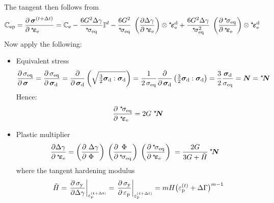 \documentclass[times,namecite]{goose-article}
\newcommand\leftstar[1]{\hspace*{-.3em}~^\star\!#1}
\begin{document}
The tangent then follows from
\begin{equation}
\mathbb{C}_\mathrm{ep}
=
\frac{
  \partial \, \bm{\sigma}^{(t+\Delta t)} \hfill
}{
  \partial \, \leftstar{\bm{\varepsilon}}_\mathrm{e} \hfill
}
=
\mathbb{C}_\mathrm{e}
- \frac{6 G^2 \Delta \gamma}{\leftstar{\sigma}_\mathrm{eq}} \mathbb{I}^d
- \frac{6 G^2}{\leftstar{\sigma}_\mathrm{eq}} \;
\left( \frac{
  \partial \Delta \gamma \hfill
}{
  \partial \,\leftstar{\bm{\varepsilon}}_\mathrm{e} \hfill
} \right) \otimes
\leftstar{\bm{\varepsilon}}_\mathrm{e}^\mathrm{d}
+ \frac{6 G^2 \Delta \gamma}{\leftstar{\sigma}_\mathrm{eq}^2} \;
\left( \frac{
  \partial \,\leftstar{\sigma}_\mathrm{eq} \hfill
}{
  \partial \,\leftstar{\bm{\varepsilon}}_\mathrm{e} \hfill
} \right) \otimes
\leftstar{\bm{\varepsilon}}_\mathrm{e}^\mathrm{d}
\end{equation}
Now apply the following:
\begin{itemize}
%
\item Equivalent stress
\begin{equation}
\frac{\partial\, \sigma_\mathrm{eq} \hfill}{\partial\, \bm{\sigma} \hfill}
  = \frac{
    \partial\, \sigma_\mathrm{eq} \hfill
  }{
    \partial\, \bm{\sigma}_\mathrm{d} \hfill
  }
  = \frac{
    \partial
  }{
    \partial\, \bm{\sigma}_\mathrm{d}
  } \left(
    \sqrt{ \tfrac{3}{2} \bm{\sigma}_\mathrm{d} : \bm{\sigma}_\mathrm{d} }
  \right)
  = \frac{1}{2 \, \sigma_\mathrm{eq} }
  \frac{\partial}{\partial\, \bm{\sigma}_\mathrm{d}}
  \left(
    \tfrac{3}{2} \bm{\sigma}_\mathrm{d} : \bm{\sigma}_\mathrm{d}
  \right)
  = \frac{3}{2} \frac{\bm{\sigma}_\mathrm{d}}{\sigma_\mathrm{eq}}
  = \bm{N} = \leftstar{\bm{N}}
\end{equation}
Hence:
\begin{equation}
\frac{
    \partial \;\leftstar{\sigma}_\mathrm{eq} \hfill
  }{
    \partial \;\leftstar{\bm{\varepsilon}}_\mathrm{e} \hfill
  } =
  2 G \;\leftstar{\bm{N}}
\end{equation}
%
\item Plastic multiplier
\begin{align}
  \frac{
    \partial \Delta \gamma \hfill
  }{
    \partial \,\leftstar{\bm{\varepsilon}}_\mathrm{e}  \hfill
  }
  =
  \left( \frac{
    \partial ~\Delta \gamma \hfill
  }{
    \partial ~\Phi \hfill
  } \right) \;
  \left( \frac{
    \partial \,~\Phi \hfill
  }{
    \partial \,\leftstar{\sigma}_\mathrm{eq} \hfill
  } \right) \;
  \left( \frac{
    \partial \,\leftstar{\sigma}_\mathrm{eq} \hfill
  }{
    \partial \,\leftstar{\bm{\varepsilon}}_\mathrm{e} \hfill
  } \right) \;
  &= \frac{2 G}{3 G + \tilde{H}} \, \leftstar{\bm{N}}
\end{align}
where the tangent hardening modulus
\begin{equation}
  \tilde{H} =
  \left.
  \frac{
    \partial\, \sigma_\mathrm{y} \hfill
  }{
    \partial   \Delta \gamma \hfill
  }
  \right|_{ \varepsilon^{(t + \Delta t)}_\mathrm{p} }
  =
  \left. \frac{
    \partial\, \sigma_\mathrm{y} \hfill
  }{
    \partial\, \varepsilon_\mathrm{p} \hfill
  } \right|_{ \varepsilon^{(t + \Delta t)}_\mathrm{p} }
  =
  m H \big( \varepsilon^{(t)}_\mathrm{p} + \Delta \Gamma \big)^{m - 1}
\end{equation}
%
\end{itemize}
\end{document}
